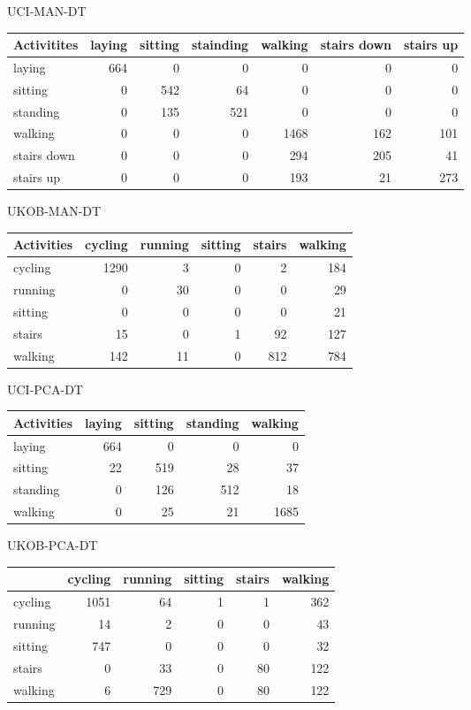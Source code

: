 UCI-MAN-DT

\begin{tabular}{|l|rrrrrr|} \hline
Activitites & laying & sitting & stainding & walking & stairs down & stairs up\\
\hline
laying & 664 & 0 & 0 & 0 & 0 & 0\\
sitting & 0 & 542 & 64 & 0 & 0 & 0\\
standing & 0 & 135 & 521 & 0 & 0 & 0\\
walking & 0 & 0 & 0 & 1468 & 162 & 101\\
stairs down & 0 & 0 & 0 & 294 & 205 & 41\\
stairs up & 0 & 0 & 0 & 193 & 21 & 273\\
\hline
\end{tabular}

UKOB-MAN-DT

\begin{tabular}{|l|rrrrr|} \hline
Activities & cycling & running & sitting & stairs & walking\\
\hline
cycling & 1290 & 3 & 0 & 2 & 184\\
running & 0 & 30 & 0 & 0 & 29\\
sitting & 0 & 0 & 0 & 0 & 21\\
stairs & 15 & 0 & 1 & 92 & 127\\
walking & 142 & 11 & 0 & 812 & 784\\
\hline
\end{tabular}

UCI-PCA-DT

\begin{tabular}{|l|rrrr|} \hline
Activities & laying & sitting & standing & walking\\
\hline
laying & 664 & 0 & 0 & 0\\
sitting & 22 & 519 & 28 & 37\\
standing & 0 & 126 & 512 & 18\\
walking & 0 & 25 & 21 & 1685\\
\hline
\end{tabular}

UKOB-PCA-DT

\begin{tabular}{|l|rrrrr|} \hline
 & cycling & running & sitting & stairs & walking\\
\hline
cycling & 1051 & 64 & 1 & 1 & 362\\
running & 14 & 2 & 0 & 0 & 43\\
sitting & 747 & 0 & 0 & 0 & 32\\
stairs & 0 & 33 & 0 & 80 & 122\\
walking & 6 & 729 & 0 & 80 & 122\\
\hline
\end{tabular}

